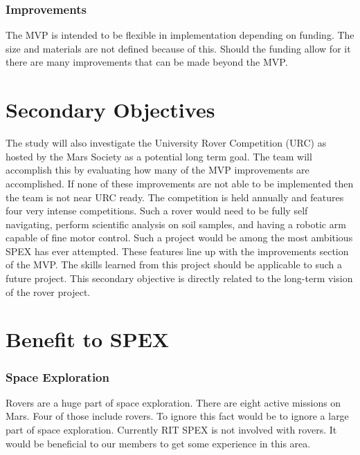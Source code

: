 \documentclass[conference]{IEEEtran} %
\begin{document}
\subsubsection{Improvements}

  The MVP is intended to be flexible in implementation depending on funding. The size and materials are not defined because of this. Should the funding allow for it there are many improvements that can be made beyond the MVP. 


\section{Secondary Objectives}
\label{sec:secondary-obj}
The study will also investigate the University Rover Competition (URC) as hosted by the Mars Society as a potential long term goal. 
The team will accomplish this by evaluating how many of the MVP improvements are accomplished. 
If none of these improvements are not able to be implemented then the team is not near URC ready.
The competition is held annually and features four very intense competitions. 
Such a rover would need to be fully self navigating, perform scientific analysis on soil samples, and having a robotic arm capable of fine motor control. 
Such a project would be among the most ambitious SPEX has ever attempted. 
These features line up with the improvements section of the MVP.
The skills learned from this project should be applicable to such a future project. 
This secondary objective is directly related to the long-term vision of the rover project. 

\section{Benefit to SPEX}
\label{sec:benefit}

\subsubsection{Space Exploration}
Rovers are a huge part of space exploration. 
There are eight active missions on Mars. 
Four of those include rovers. 
To ignore this fact would be to ignore a large part of space exploration.
Currently RIT SPEX is not involved with rovers.
It would be beneficial to our members to get some experience in this area.
\end{document}
